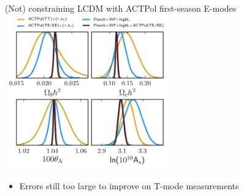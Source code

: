 \documentclass[table]{beamer}
\begin{document}
\begin{frame}{(Not) constraining LCDM with ACTPol first-season E-modes}
	\centering
	\includegraphics[width=7cm]{actpol_parameters_from_pol.pdf}
	\begin{itemize}
		\item<2> Errors still too large to improve on T-mode measurements
	\end{itemize}
\end{frame}

\end{document}
